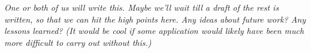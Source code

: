 {\it \color{red} One or both of us will write this.  Maybe we'll wait
  till a draft of the rest is written, so that we can hit the high
  points here.  Any ideas about future work?  Any lessons learned?
  (It would be cool if some application would likely have been much
  more difficult to carry out without this.)}
